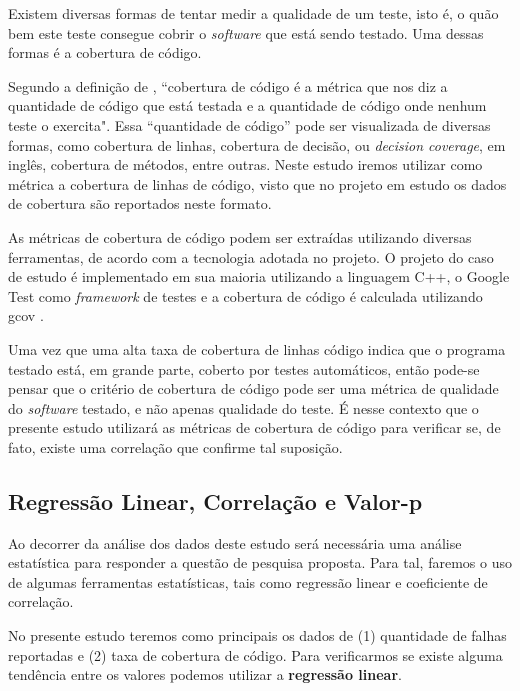 \documentclass[11.5pt]{article}
\begin{document}
Existem diversas formas de tentar medir a qualidade de um teste, isto é, o quão bem este teste
consegue cobrir o \textit{software} que está sendo testado.
Uma dessas formas é a cobertura de código.

Segundo a definição de \cite{tddBook}, ``cobertura de código é a métrica que nos diz a quantidade de
código que está testada e a quantidade de código onde nenhum teste o exercita".
Essa ``quantidade de código'' pode ser visualizada de diversas formas, como cobertura de linhas,
cobertura de decisão, ou \textit{decision coverage}, em inglês, cobertura de métodos, entre outras.
Neste estudo iremos utilizar como métrica a cobertura de linhas de código, visto que no projeto em
estudo os dados de cobertura são reportados neste formato.

As métricas de cobertura de código podem ser extraídas utilizando diversas ferramentas, de acordo
com a tecnologia adotada no projeto.
O projeto do caso de estudo é implementado em sua maioria utilizando a linguagem C++, o
Google Test \cite{googleTest} como \textit{framework} de testes e
a cobertura de código é calculada utilizando gcov \cite{gcov}.

Uma vez que uma alta taxa de cobertura de linhas código indica que o programa testado está, em
grande parte, coberto por testes automáticos, então pode-se pensar que o critério de cobertura de
código pode ser uma métrica de qualidade do \textit{software} testado, e não apenas qualidade do
teste.
É nesse contexto que o presente estudo utilizará as métricas de cobertura de código para verificar
se, de fato, existe uma correlação que confirme tal suposição.


\subsection{Regressão Linear, Correlação e Valor-p}

Ao decorrer da análise dos dados deste estudo será necessária uma análise estatística para responder
a questão de pesquisa proposta.
Para tal, faremos o uso de algumas ferramentas estatísticas, tais como regressão linear e
coeficiente de correlação.

No presente estudo teremos como principais os dados de (1) quantidade de falhas reportadas e (2)
taxa de cobertura de código.
Para verificarmos se existe alguma tendência entre os valores podemos utilizar a
\textbf{regressão linear}.
\end{document}
